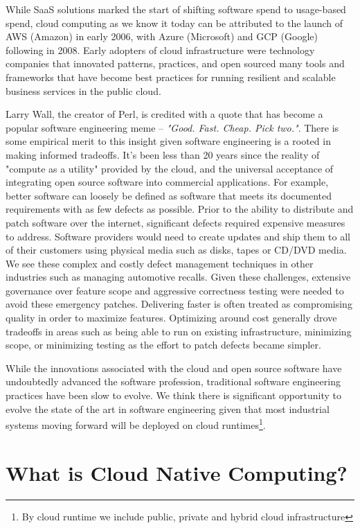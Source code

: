 \documentclass[conference]{IEEEconf}
\begin{document}
While SaaS solutions marked the start of shifting software spend to usage-based spend, cloud computing as we know it today can be attributed to the launch of AWS (Amazon) \cite{AWSLaunch} in early 2006, with Azure (Microsoft)\cite{AzureLaunch} and GCP (Google)\cite{GCPLaunch} following in 2008. Early adopters of cloud infrastructure were technology companies that innovated patterns, practices, and open sourced many tools and frameworks that have become best practices for running resilient and scalable business services in the public cloud.  

Larry Wall, the creator of Perl, is credited with a quote that has become a popular software engineering meme -- \textit{"Good. Fast. Cheap. Pick two."}.  There is some empirical merit to this insight given software engineering is a rooted in making informed tradeoffs.  It's been less than 20 years since the reality of "compute as a utility" provided by the cloud, and the universal acceptance of integrating open source software into commercial applications. For example, better software can loosely be defined as software that meets its documented requirements with as few defects as possible.  Prior to the ability to distribute and patch software over the internet, significant defects required expensive measures to address.  Software providers would need to create updates and ship them to all of their customers using physical media such as disks, tapes or CD/DVD media.  We see these complex and costly defect management techniques in other industries such as managing automotive recalls. Given these challenges, extensive governance over feature scope and aggressive correctness testing were needed to avoid these emergency patches.  Delivering faster is often treated as compromising quality in order to maximize features. Optimizing around cost generally drove tradeoffs in areas such as being able to run on existing infrastructure, minimizing scope, or minimizing testing as the effort to patch defects became simpler. 

While the innovations associated with the cloud and open source software have undoubtedly advanced the software profession, traditional software engineering practices have been slow to evolve.  We think there is significant opportunity to evolve the state of the art in software engineering given that most industrial systems moving forward will be deployed on cloud runtimes\footnote{By cloud runtime we include public, private and hybrid cloud infrastructure}. 

\section{What is Cloud Native Computing?}
\label{sec:WhatIsCNF}
\end{document}
